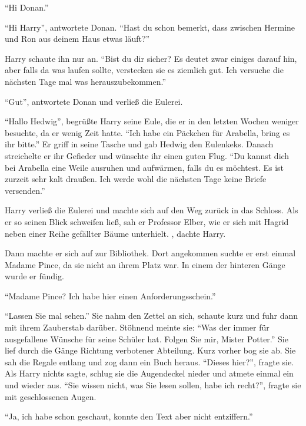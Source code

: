 \enquote{Hi Donan.}

\enquote{Hi Harry}, antwortete Donan. \enquote{Hast du schon bemerkt, dass zwischen Hermine und Ron aus deinem Haus etwas läuft?}

Harry schaute ihn nur an. \enquote{Bist du dir sicher? Es deutet zwar einiges darauf hin, aber falls da was laufen sollte, verstecken sie es ziemlich gut. Ich versuche die nächsten Tage mal was herauszubekommen.}

\enquote{Gut}, antwortete Donan und verließ die Eulerei.

\enquote{Hallo Hedwig}, begrüßte Harry seine Eule, die er in den letzten Wochen weniger besuchte, da er wenig Zeit hatte. \enquote{Ich habe ein Päckchen für Arabella, bring es ihr bitte.} Er griff in seine Tasche und gab Hedwig den Eulenkeks. Danach streichelte er ihr Gefieder und wünschte ihr einen guten Flug. \enquote{Du kannst dich bei Arabella eine Weile ausruhen und aufwärmen, falls du es möchtest. Es ist zurzeit sehr kalt draußen. Ich werde wohl die nächsten Tage keine Briefe versenden.}

Harry verließ die Eulerei und machte sich auf den Weg zurück in das Schloss. Als er so seinen Blick schweifen ließ, sah er Professor Elber, wie er sich mit Hagrid neben einer Reihe gefällter Bäume unterhielt. , dachte Harry. 

Dann machte er sich auf zur Bibliothek. Dort angekommen suchte er erst einmal Madame Pince, da sie nicht an ihrem Platz war. In einem der hinteren Gänge wurde er fündig.

\enquote{Madame Pince? Ich habe hier einen Anforderungsschein.}

\enquote{Lassen Sie mal sehen.} Sie nahm den Zettel an sich, schaute kurz und fuhr dann mit ihrem Zauberstab darüber. Stöhnend meinte sie: \enquote{Was der immer für ausgefallene Wünsche für seine Schüler hat. \gst Folgen Sie mir, Mister Potter.} Sie lief durch die Gänge Richtung verbotener Abteilung. Kurz vorher bog sie ab. Sie sah die Regale entlang und zog dann ein Buch heraus. \enquote{Dieses hier?}, fragte sie. Als Harry nichts sagte, schlug sie die Augendeckel nieder und atmete einmal ein und wieder aus. \enquote{Sie wissen nicht, was Sie lesen sollen, habe ich recht?}, fragte sie mit geschlossenen Augen.

\enquote{Ja, ich habe schon geschaut, konnte den Text aber nicht entziffern.}

